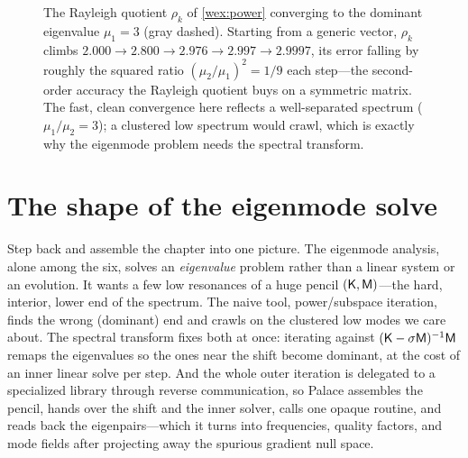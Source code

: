 \begin{figure}[t]
\centering
{}
\caption[Power-iteration convergence of the Rayleigh quotient]{The Rayleigh
quotient $\rho_k$ of \cref{wex:power} converging to the dominant eigenvalue
$\mu_1=3$ (gray dashed). Starting from a generic vector, $\rho_k$ climbs
$2.000\to2.800\to2.976\to2.997\to2.9997$, its error falling by roughly the squared
ratio $(\mu_2/\mu_1)^2=1/9$ each step---the second-order accuracy the Rayleigh
quotient buys on a symmetric matrix. The fast, clean convergence here reflects a
well-separated spectrum ($\mu_1/\mu_2=3$); a clustered low spectrum would crawl,
which is exactly why the eigenmode problem needs the spectral transform.}
\label{fig:power-conv}
\end{figure}

\section{The shape of the eigenmode solve}

Step back and assemble the chapter into one picture. The eigenmode analysis,
alone among the six, solves an \emph{eigenvalue} problem rather than a linear
system or an evolution. It wants a few low resonances of a huge pencil
$(\mathsf{K},\mathsf{M})$---the hard, interior, lower end of the spectrum. The naive tool,
power/subspace iteration, finds the wrong (dominant) end and crawls on the
clustered low modes we care about. The spectral transform fixes both at once:
iterating against $(\mathsf{K}-\sigma\mathsf{M})^{-1}\mathsf{M}$ remaps the eigenvalues so the ones
near the shift become dominant, at the cost of an inner linear solve per step. And
the whole outer iteration is delegated to a specialized library through reverse
communication, so Palace assembles the pencil, hands over the shift and the inner
solver, calls one opaque routine, and reads back the eigenpairs---which it turns
into frequencies, quality factors, and mode fields after projecting away the
spurious gradient null space.

